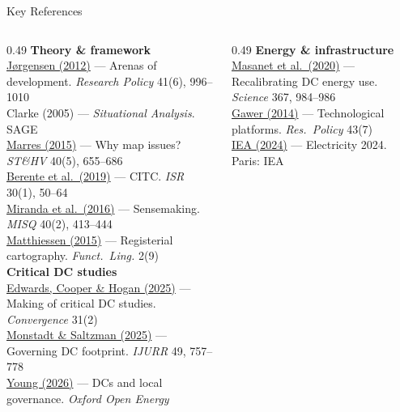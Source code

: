 \documentclass[aspectratio=169,11pt]{beamer}
\newcommand{\iconfull}[2]{\textcolor{#1}{\faIcon{#2}}}
\begin{document}
\begin{frame}[allowframebreaks]{\iconfull{dcblue}{book}\enspace Key References}
\begin{columns}[T]
\begin{column}{0.49\textwidth}
{\scriptsize
\textbf{Theory \& framework}\\[0.3em]
\href{https://doi.org/10.1016/j.respol.2012.03.001}{Jørgensen (2012)} — Arenas of development.
\textit{Research Policy} 41(6), 996--1010\\[0.2em]
Clarke (2005) — \textit{Situational Analysis}.
SAGE\\[0.2em]
\href{https://doi.org/10.1177/0162243915574602}{Marres (2015)} — Why map issues?
\textit{ST\&HV} 40(5), 655--686\\[0.2em]
\href{https://doi.org/10.1287/isre.2018.0774}{Berente et al.\ (2019)} — CITC.
\textit{ISR} 30(1), 50--64\\[0.2em]
\href{https://doi.org/10.25300/MISQ/2016/40.2.06}{Miranda et al.\ (2016)} — Sensemaking.
\textit{MISQ} 40(2), 413--444\\[0.2em]
\href{https://doi.org/10.1186/s40554-015-0015-8}{Matthiessen (2015)} — Registerial cartography.
\textit{Funct.\ Ling.} 2(9)\\[0.4em]
\textbf{Critical DC studies}\\[0.3em]
\href{https://doi.org/10.1177/13548565231224157}{Edwards, Cooper \& Hogan (2025)} — Making of critical DC studies.
\textit{Convergence} 31(2)\\[0.2em]
\href{https://doi.org/10.1111/1468-2427.13316}{Monstadt \& Saltzman (2025)} — Governing DC footprint.
\textit{IJURR} 49, 757--778\\[0.2em]
\href{https://doi.org/10.1093/ooenergy/oiaf001}{Young (2026)} — DCs and local governance.
\textit{Oxford Open Energy}
}
\end{column}
\begin{column}{0.49\textwidth}
{\scriptsize
\textbf{Energy \& infrastructure}\\[0.3em]
\href{https://doi.org/10.1126/science.aba3758}{Masanet et al.\ (2020)} — Recalibrating DC energy use. \textit{Science} 367, 984--986\\[0.2em]
\href{https://doi.org/10.1016/j.respol.2014.03.006}{Gawer (2014)} — Technological platforms. \textit{Res.\ Policy} 43(7)\\[0.2em]
\href{https://www.iea.org/reports/electricity-2024}{IEA (2024)} — Electricity 2024. Paris: IEA\\[0.2em]
}
\end{column}
\end{columns}
\end{frame}
\end{document}
